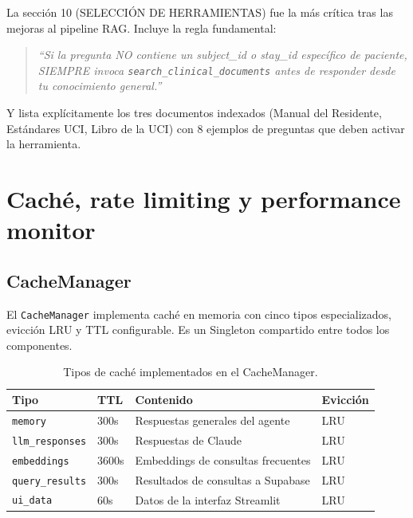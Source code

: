 La sección 10 (SELECCIÓN DE HERRAMIENTAS) fue la más crítica tras las mejoras al pipeline \ac{RAG}. Incluye la regla fundamental:

\begin{quote}
\footnotesize\itshape
``Si la pregunta NO contiene un subject\_id o stay\_id específico de paciente, SIEMPRE invoca \texttt{search\_clinical\_documents} antes de responder desde tu conocimiento general.''
\end{quote}

Y lista explícitamente los tres documentos indexados (Manual del Residente, Estándares \ac{UCI}, Libro de la \ac{UCI}) con 8 ejemplos de preguntas que deben activar la herramienta.

\section{Caché, rate limiting y performance monitor}
\label{sec:appendix_infra}

\subsection{CacheManager}

El \texttt{CacheManager} implementa caché en memoria con cinco tipos especializados, evicción \ac{LRU} y \ac{TTL} configurable. Es un Singleton compartido entre todos los componentes.

\begin{table}[H]
\centering
\caption{Tipos de caché implementados en el CacheManager.}
\label{tab:appendix_cache}
\footnotesize
\begin{tabularx}{\columnwidth}{llXl}
\toprule
\textbf{Tipo} & \textbf{TTL} & \textbf{Contenido} & \textbf{Evicción} \\
\midrule
\texttt{memory} & 300s & Respuestas generales del agente & \ac{LRU} \\
\texttt{llm\_responses} & 300s & Respuestas de Claude & \ac{LRU} \\
\texttt{embeddings} & 3600s & Embeddings de consultas frecuentes & \ac{LRU} \\
\texttt{query\_results} & 300s & Resultados de consultas a Supabase & \ac{LRU} \\
\texttt{ui\_data} & 60s & Datos de la interfaz Streamlit & \ac{LRU} \\
\bottomrule
\end{tabularx}
\end{table}

